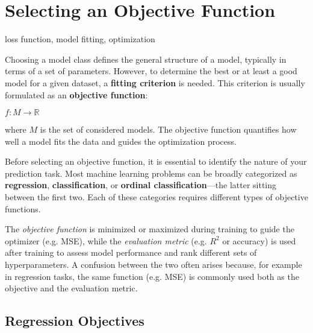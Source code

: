 \documentclass[12pt,openany, draft]{book}
\begin{document}
\section{Selecting an Objective Function}

\begin{keywordsbox}
loss function, model fitting, optimization
\end{keywordsbox}


Choosing a model class defines the general structure of a model, 
typically in terms of a set of parameters. However, to determine 
the best or at least a good model for a given dataset, a 
\textbf{fitting criterion} is needed. This criterion is usually 
formulated as an \textbf{objective function}:

\ensuremath{f : M \to \mathbb{R}}

where \( M \) is the set of considered models. The objective function 
quantifies how well a model fits the data and guides the optimization 
process.

Before selecting an objective function, it is essential to identify 
the nature of your prediction task. Most machine learning problems 
can be broadly categorized as \textbf{regression}, 
\textbf{classification}, or \textbf{ordinal classification}—the latter 
sitting between the first two. Each of these categories requires 
different types of objective functions.

\begin{notebox}
The \textit{objective function} is minimized or maximized during training 
to guide the optimizer (e.g. MSE), while the \textit{evaluation metric} 
(e.g. $R^2$ or accuracy) is used after training to assess model performance 
and rank different sets of hyperparameters. A confusion between the two 
often arises because, for example in regression tasks, the same function (e.g. MSE) is 
commonly used both as the objective and the evaluation metric.
\end{notebox}


\subsection{Regression Objectives}
\end{document}
